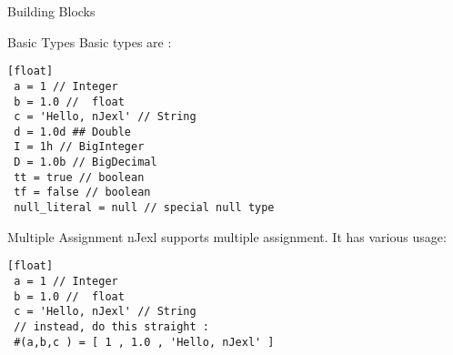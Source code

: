 \begin{section}{Building Blocks}
\begin{subsection}{Basic Types}
Basic types are :
\begin{lstlisting}[style=JexlStyle][float]
 a = 1 // Integer 
 b = 1.0 //  float 
 c = 'Hello, nJexl' // String 
 d = 1.0d ## Double 
 I = 1h // BigInteger 
 D = 1.0b // BigDecimal  
 tt = true // boolean 
 tf = false // boolean 
 null_literal = null // special null type
\end{lstlisting}

\end{subsection}

\begin{subsection}{Multiple Assignment}
nJexl supports multiple assignment. It has various usage:

\begin{lstlisting}[style=JexlStyle][float]
 a = 1 // Integer 
 b = 1.0 //  float 
 c = 'Hello, nJexl' // String 
 // instead, do this straight :
 #(a,b,c ) = [ 1 , 1.0 , 'Hello, nJexl' ]   
\end{lstlisting}
\end{subsection}
\end{section}

